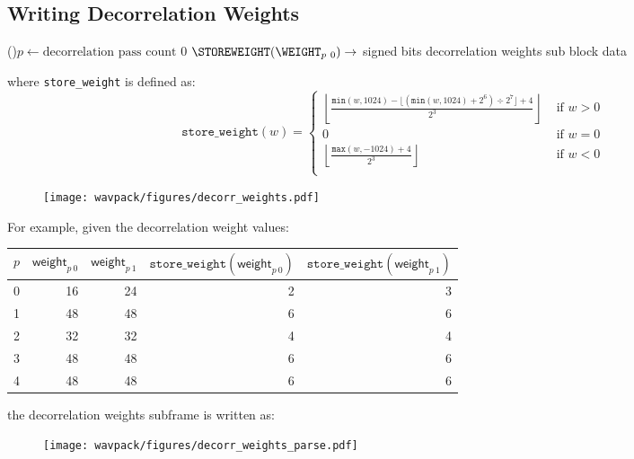 
\subsection{Writing Decorrelation Weights}
\label{wavpack:write_decorr_weights}
\For(){$p \leftarrow \text{decorrelation pass count}$ \emph{\KwDownTo}0}{
  $\texttt{\STOREWEIGHT}(\text{\WEIGHT}_{p~0}) \rightarrow$  signed bits\;
}
\Return decorrelation weights sub block data\;
\EALGORITHM
\par
\noindent
where \texttt{store\_weight} is defined as:
\begin{equation*}
\texttt{store\_weight}(w) =
\begin{cases}
\left\lfloor\frac{\texttt{min}(w, 1024) - \lfloor(\texttt{min}(w,1024) + 2 ^ 6) \div 2 ^ 7\rfloor + 4}{2 ^ 3}\right\rfloor & \text{ if } w > 0 \\
0 & \text{ if } w = 0 \\
\left\lfloor \frac{\texttt{max}(w, -1024) + 4}{2 ^ 3} \right\rfloor & \text{ if } w < 0 \\
\end{cases}
\end{equation*}
\begin{figure}[h]
  \texttt{[image: wavpack/figures/decorr\_weights.pdf]}
\end{figure}
\clearpage
For example, given the decorrelation weight values:
\begin{table}[h]
\begin{tabular}{rrrrr}
$p$ & $\textsf{weight}_{p~0}$ & $\textsf{weight}_{p~1}$ &
$\texttt{store\_weight}(\textsf{weight}_{p~0})$ &
$\texttt{store\_weight}(\textsf{weight}_{p~1})$ \\
\hline
0 & 16 & 24 & 2 & 3 \\
1 & 48 & 48 & 6 & 6 \\
2 & 32 & 32 & 4 & 4 \\
3 & 48 & 48 & 6 & 6 \\
4 & 48 & 48 & 6 & 6 \\
\end{tabular}
\end{table}
\par
\noindent
the decorrelation weights subframe is written as:
\begin{figure}[h]
\texttt{[image: wavpack/figures/decorr\_weights\_parse.pdf]}
\end{figure}
